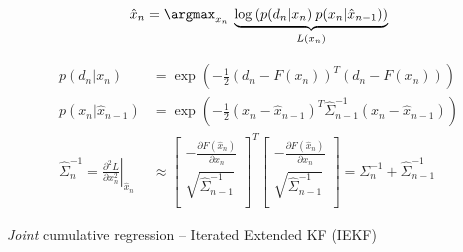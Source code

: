 \begin{algorithm}
\begin{equation*}
\begin{aligned}
\hat{x}_n &= \argmax_{x_n} \:
\underbrace{\log \left( p(d_n|x_n) \: p(x_n |\hat{x}_{n - 1}) \right)}_{L(x_n)}   
\\
\end{aligned}
\end{equation*}

\begin{equation*}
\begin{aligned}
p(d_n|x_n) &= \exp \left( -\tfrac{1}{2} (d_n - F(x_n))^T (d_n - F(x_n)) \right)
\\
p(x_n |\hat{x}_{n - 1}) &= \exp \left( -\tfrac{1}{2}(x_n - \hat{x}_{n - 1})^T \hat{\Sigma}_{n - 1}^{-1} (x_n - \hat{x}_{n - 1})\right)
\\
\hat{\Sigma}_n^{-1} = 
\left.\tfrac{\partial^2 L}{\partial x_n^2}\right|_{\hat{x}_n} &\approx 
\left[
	\begin{array}{cc}
		- \tfrac{\partial F(\hat{x}_n)} {\partial x_n} \\
		\sqrt{\hat{\Sigma}_{n - 1}^{-1}} \\
	\end{array}
\right]^T 
\left[
	\begin{array}{c}
		-\tfrac{\partial F(\hat{x}_n)} {\partial x_n} \\
		\sqrt{\hat{\Sigma}_{n - 1}^{-1}} \\
	\end{array}
\right] 
= \Sigma_{n}^{-1} + \hat{\Sigma}_{n-1}^{-1}
\end{aligned}
\end{equation*}
\caption{\emph{Joint} cumulative regression -- Iterated Extended KF (IEKF)}
\label{alg:interframeplus}
\label{alg:iekf-like}
\label{tab:iekf-like}
\end{algorithm}

